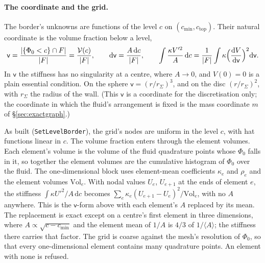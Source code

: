 \documentclass[11pt]{article}
\theoremstyle{definition}
\theoremstyle{remark}
\newcommand{\dc}{\,\mathrm{d}c}
\newcommand{\Vol}{\mathcal V}
\newcommand{\code}[1]{\texttt{#1}}
\begin{document}
\paragraph{The coordinate and the grid.} The border's unknowns are
functions of the level $c$ on $(c_{\min}, c_{\mathrm{top}})$. Their
natural coordinate is the volume fraction below a level,
\begin{equation*}
  \mathsf v = \frac{|\{\Phi_0 < c\}\cap F|}{|F|} = \frac{\Vol(c)}{|F|},
  \qquad
  \mathrm d\mathsf v = \frac{A\dc}{|F|},
  \qquad
  \int\frac{\kappa V'^2}{A}\dc = \frac{1}{|F|}\int\kappa\Bigl(\frac{\mathrm dV}{\mathrm d\mathsf v}\Bigr)^2\mathrm d\mathsf v .
\end{equation*}
In $\mathsf v$ the stiffness has no singularity at a centre, where $A
\to 0$, and $V(0) = 0$ is a plain essential condition. On the sphere
$\mathsf v = (r/r_\Sigma)^3$, and on the disc $(r/r_\Sigma)^2$, with
$r_\Sigma$ the radius of the wall. (This $\mathsf v$ is a coordinate
for the discretisation only; the coordinate in which the fluid's
arrangement is fixed is the mass coordinate $m$ of
\S\ref{sec:exactgraph}.)

As built (\code{SetLevelBorder}), the grid's nodes are uniform in the
level $c$, with hat functions linear in $c$. The volume fraction enters
through the element volumes. Each element's volume is the volume of
the fluid quadrature points whose $\Phi_0$ falls in it, so together the
element volumes are the cumulative histogram of $\Phi_0$ over the
fluid. The one-dimensional block uses element-mean coefficients
$\kappa_e$ and $\rho_e$ and the element volumes $\mathrm{Vol}_e$. With
nodal values $U_e$, $U_{e+1}$ at the ends of element $e$, the stiffness
$\int\kappa U'^2/A\dc$ becomes $\sum_e\kappa_e(U_{e+1} -
U_e)^2/\mathrm{Vol}_e$, with no $A$ anywhere. This is the $\mathsf v$-form
above with each element's $A$ replaced by its mean. The replacement is
exact except on a centre's first element in three dimensions, where $A
\propto \sqrt{c - c_{\min}}$ and the element mean of $1/A$ is $4/3$ of
$1/\langle A\rangle$; the stiffness there carries that factor. The grid
is coarse against the mesh's resolution of $\Phi_0$, so that every
one-dimensional element contains many quadrature points. An element
with none is refused.
\end{document}
